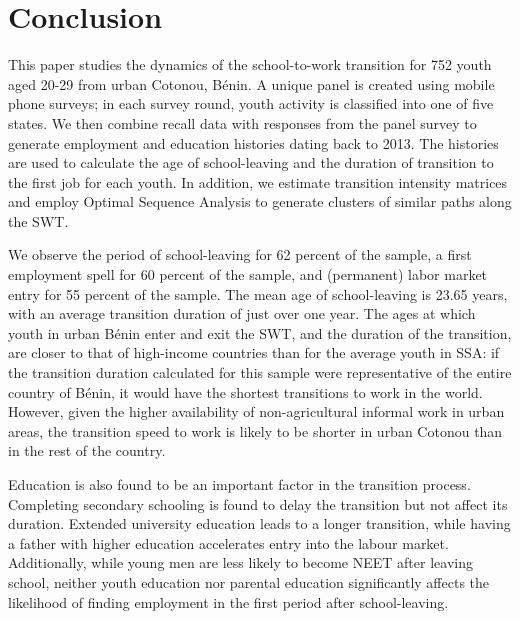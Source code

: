 \documentclass[
  a4paper, twoside, 12pt]{book}
\begin{document}
\hypertarget{survey-conclusion}{%
\section{Conclusion}\label{survey-conclusion}}

This paper studies the dynamics of the school-to-work transition for 752 youth aged 20-29 from urban Cotonou, Bénin. A unique panel is created using mobile phone surveys; in each survey round, youth activity is classified into one of five states. We then combine recall data with responses from the panel survey to generate employment and education histories dating back to 2013. The histories are used to calculate the age of school-leaving and the duration of transition to the first job for each youth. In addition, we estimate transition intensity matrices and employ Optimal Sequence Analysis to generate clusters of similar paths along the SWT.

We observe the period of school-leaving for 62 percent of the sample, a first employment spell for 60 percent of the sample, and (permanent) labor market entry for 55 percent of the sample. The mean age of school-leaving is 23.65 years, with an average transition duration of just over one year. The ages at which youth in urban Bénin enter and exit the SWT, and the duration of the transition, are closer to that of high-income countries than for the average youth in SSA: if the transition duration calculated for this sample were representative of the entire country of Bénin, it would have the shortest transitions to work in the world. However, given the higher availability of non-agricultural informal work in urban areas, the transition speed to work is likely to be shorter in urban Cotonou than in the rest of the country.

Education is also found to be an important factor in the transition process. Completing secondary schooling is found to delay the transition but not affect its duration. Extended university education leads to a longer transition, while having a father with higher education accelerates entry into the labour market. Additionally, while young men are less likely to become NEET after leaving school, neither youth education nor parental education significantly affects the likelihood of finding employment in the first period after school-leaving.
\end{document}

